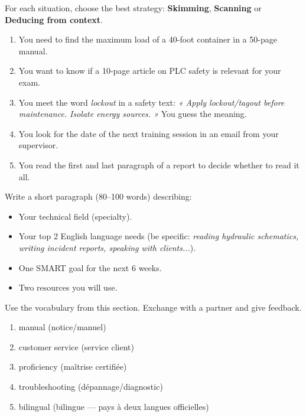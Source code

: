 \documentclass[11pt]{article}
\begin{document}
\begin{exercice}
For each situation, choose the best strategy: \textbf{Skimming}, \textbf{Scanning} or \textbf{Deducing from context}.
\begin{enumerate}
    \item You need to find the maximum load of a 40-foot container in a 50-page manual.
    \item You want to know if a 10-page article on PLC safety is relevant for your exam.
    \item You meet the word \emph{lockout} in a safety text: \emph{« Apply lockout/tagout before maintenance. Isolate energy sources. »} You guess the meaning.
    \item You look for the date of the next training session in an email from your supervisor.
    \item You read the first and last paragraph of a report to decide whether to read it all.
\end{enumerate}
\end{exercice}

\begin{exercice}
Write a short paragraph (80–100 words) describing:
\begin{itemize}
    \item Your technical field (specialty).
    \item Your top 2 English language needs (be specific: \emph{reading hydraulic schematics, writing incident reports, speaking with clients...}).
    \item One SMART goal for the next 6 weeks.
    \item Two resources you will use.
\end{itemize}
Use the vocabulary from this section. Exchange with a partner and give feedback.
\end{exercice}

\begin{corrige}
\begin{enumerate}
    \item manual (notice/manuel)
    \item customer service (service client)
    \item proficiency (maîtrise certifiée)
    \item troubleshooting (dépannage/diagnostic)
    \item bilingual (bilingue — pays à deux langues officielles)
\end{enumerate}
\end{corrige}
\end{document}
